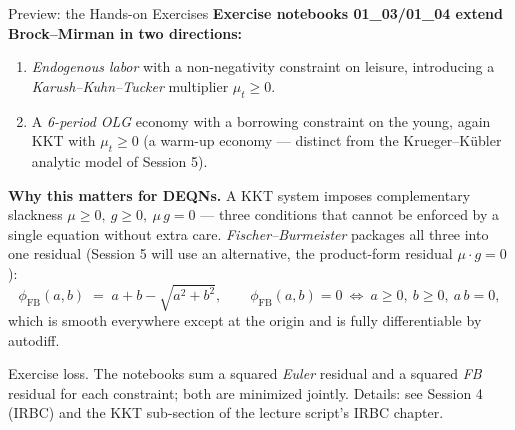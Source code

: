 \documentclass[aspectratio=169,11pt]{beamer}
\newcommand{\emphc}[1]{\textcolor{harvardcrimson}{#1}}
\begin{document}
\begin{frame}{Preview: the Hands-on Exercises}
\footnotesize
\textbf{Exercise notebooks 01\_03/01\_04 extend Brock--Mirman in two directions:}
\begin{enumerate}\itemsep2pt
    \item \emph{Endogenous labor} with a non-negativity constraint on leisure, introducing a \emph{Karush--Kuhn--Tucker} multiplier $\mu_t \ge 0$.
    \item A \emph{6-period OLG} economy with a borrowing constraint on the young, again KKT with $\mu_t \ge 0$ (a warm-up economy --- distinct from the Krueger--K\"ubler analytic model of Session 5).
\end{enumerate}

\vspace{0.4em}
\textbf{Why this matters for DEQNs.}  A KKT system imposes complementary slackness $\mu \ge 0,\ g \ge 0,\ \mu\,g = 0$ --- three conditions that cannot be enforced by a single equation without extra care.  \emph{Fischer--Burmeister} packages all three into one residual (Session 5 will use an alternative, the product-form residual $\mu \cdot g = 0$):
\[
\phi_{\mathrm{FB}}(a,b) \;=\; a + b - \sqrt{a^2 + b^2}, \qquad \phi_{\mathrm{FB}}(a,b) = 0 \ \Longleftrightarrow\ a \ge 0,\ b \ge 0,\ a\,b = 0,
\]
which is smooth everywhere except at the origin and is fully differentiable by autodiff.

\vspace{0.3em}
{\footnotesize \emphc{Exercise loss.}  The notebooks sum a squared \emph{Euler} residual and a squared \emph{FB} residual for each constraint; both are minimized jointly.  Details: see Session 4 (IRBC) and the KKT sub-section of the lecture script's IRBC chapter.}
\end{frame}
\end{document}
